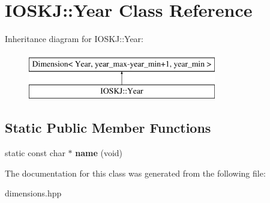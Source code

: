 \hypertarget{classIOSKJ_1_1Year}{\section{I\-O\-S\-K\-J\-:\-:Year Class Reference}
\label{classIOSKJ_1_1Year}
}
Inheritance diagram for I\-O\-S\-K\-J\-:\-:Year\-:\begin{figure}[H]
\begin{center}
\leavevmode
\includegraphics[height=2.000000cm]{classIOSKJ_1_1Year}
\end{center}
\end{figure}
\subsection*{Static Public Member Functions}
\begin{DoxyCompactItemize}
\item 
\hypertarget{classIOSKJ_1_1Year_a6e310c45eb605b1464b2bc47873afca0}{static const char $\ast$ {\bfseries name} (void)}\label{classIOSKJ_1_1Year_a6e310c45eb605b1464b2bc47873afca0}

\end{DoxyCompactItemize}


The documentation for this class was generated from the following file\-:\begin{DoxyCompactItemize}
\item 
dimensions.\-hpp\end{DoxyCompactItemize}
